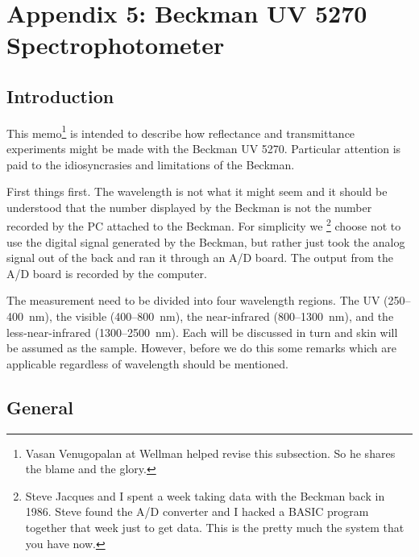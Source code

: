 \documentclass{article}
\begin{document}
\clearpage
\section*{Appendix 5: Beckman UV 5270 Spectrophotometer}

\subsection*{Introduction}
This memo\footnote{Vasan Venugopalan
at Wellman helped revise this subsection.  So he shares the blame and the glory.}
 is intended to describe how reflectance and transmittance experiments might be 
made with the Beckman UV 5270.   Particular attention is paid to the idiosyncrasies and
limitations of the Beckman.

First things first.  The wavelength is not what it might seem and
it should be understood that the number displayed by the Beckman is
not the number recorded by the PC attached to the Beckman.  For simplicity
we \footnote{Steve Jacques and I spent a week taking data with the 
Beckman back in 1986.  Steve found the A/D converter and I hacked a BASIC
program together that week just to get data.  This is the pretty much the
system that you have now.} choose not to use the digital signal generated by the Beckman, but
rather just took the analog signal out of the back and ran it through
an A/D board.  The output from the A/D board is recorded by the computer.

The measurement need to be divided into four wavelength regions. The UV (250--400~nm),
the visible (400--800~nm), the near-infrared (800--1300~nm), and the less-near-infrared
(1300--2500~nm).  Each will be discussed in turn and skin will be assumed as the
sample. However, before we do this some remarks which are applicable regardless of
wavelength should be mentioned.

\subsection*{General}
\end{document}
